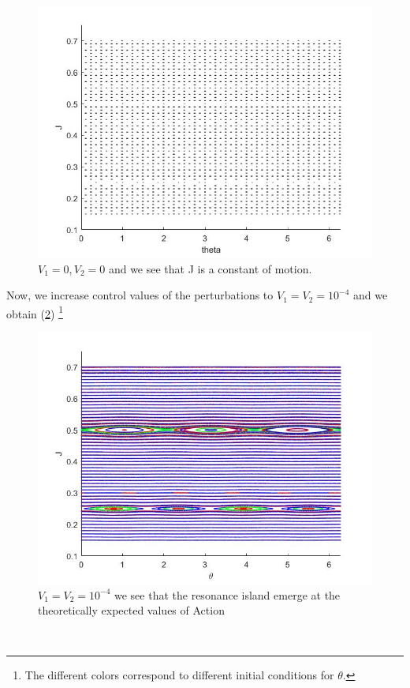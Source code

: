 	\begin{figure}[h!]
		\centering
		\includegraphics[scale=0.5]{Hamiltonian_1/numerical/figs/Q5_0.0_3646}
		\caption{$V_1=0,V_2=0$ and we see that J is a constant of motion.}
		\label{fig2.1}	
	\end{figure}\newpage
%
%
Now, we increase control values of the perturbations to $V_1=V_2=10^{-4}$ and we obtain (\ref{fig2.2}) \footnote{The different colors correspond to different initial conditions for $\theta$.}
	\begin{figure}[h!]
		\centering 
		\includegraphics[scale=0.5]{Hamiltonian_1/numerical/figs/Q5_1e-4.1e-4_3634}
		\caption{$V_1=V_2=10^{-4}$ we see that the resonance island emerge at the theoretically expected values of Action}
		\label{fig2.2}
	\end{figure}\\
	
